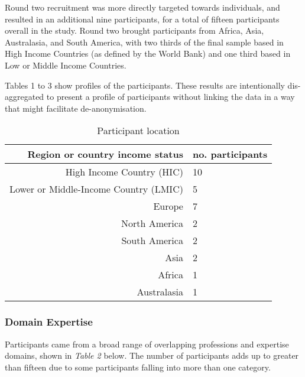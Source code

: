 \documentclass{CUP-JNL-DAP}%
\begin{document}
Round two recruitment was more directly targeted towards individuals, and resulted in an additional nine participants, for a total of fifteen participants overall in the study. Round two brought participants from Africa, Asia, Australasia, and South America, with two thirds of the final sample based in High Income Countries (as defined by the World Bank) and one third based in Low or Middle Income Countries. 

Tables 1 to 3 show profiles of the participants. These results are intentionally dis-aggregated to present a profile of participants without linking the data in a way that might facilitate de-anonymisation.

\begin{table}[h!]
  \begin{center}
    \caption{Participant location}
    \label{tab:locations}
    \begin{tabular}{r|l} %
      \textbf{Region or country income status} & \textbf{no. participants} \\
      \hline
        High Income Country (HIC)&10\\
        Lower or Middle-Income Country (LMIC) &5 \\
        \hline
        Europe&7\\
        North America&2\\
        South America&2\\
        Asia&2\\
        Africa&1\\
        Australasia&1\\
    \end{tabular}
  \end{center}
\end{table}


\subsubsection{Domain Expertise}

Participants came from a broad range of overlapping professions and expertise domains, shown in \textit{Table 2} below.  The number of participants adds up to greater than fifteen due to some participants falling into more than one category.  
\end{document}
